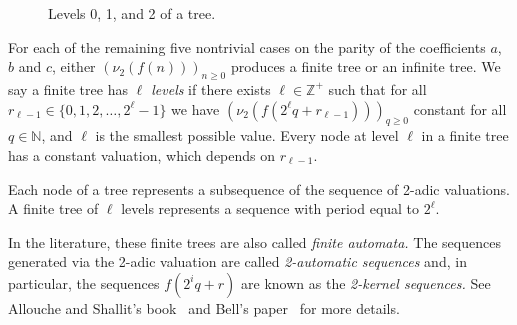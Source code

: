 \documentclass[12pt]{article}
\begin{document}
\begin{figure}
\begin{center}
\end{center}
\caption{Levels 0, 1, and 2 of a tree.}
\end{figure}

For each of the remaining five nontrivial cases on the parity of the coefficients $a$, $b$ and $c$, either $(\nu_{2}(f(n)))_{n\geq0}$ produces a finite tree or an infinite tree. We say a finite tree has \textit{$\ell$ levels} if there exists $\ell\in\mathbb{Z}^{+}$ such that for all $r_{\ell-1}\in\{0,1,2,\ldots,2^{\ell}-1\}$ we have $(\nu_{2}(f(2^{\ell}q+r_{\ell-1})))_{q\geq 0}$ constant for all $q\in\mathbb{N}$, and $\ell$ is the smallest possible value. Every node at level $\ell$ in a finite tree has a constant valuation, which depends on $r_{\ell-1}$.

Each node of a tree represents a subsequence of the sequence of 2-adic valuations. A finite tree of $\ell$ levels represents a sequence with period equal to $2^{\ell}$.

In the literature, these finite trees are also called \textit{finite automata.} The sequences generated via the 2-adic valuation are called \textit{2-automatic sequences} and, in particular, the sequences $f(2^{i}q+r)$ are known as the \textit{2-kernel sequences.} See Allouche and Shallit's book~\cite{AlloucheShallit} and Bell's paper~\cite{Bell} for more details.
\end{document}

